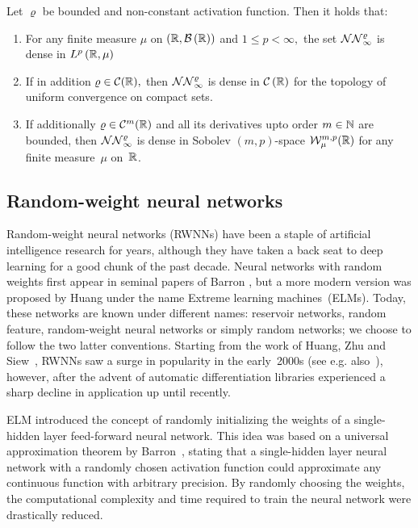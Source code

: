 \begin{theorem}\label{thm:UAT}
Let $\varrho$ be bounded and
non-constant activation function. Then it holds that:
\begin{enumerate}
\item For any finite measure $\mu$ on $\left(\mathbb{R}, \mathcal{B}\left(\mathbb{R}\right)\right)$ and $1 \leq p<\infty,$ the set
$\mathcal{NN}_{\infty}^{\varrho}$ is dense in $L^{p}\left(\mathbb{R}, \mu\right)$
\item If in addition $\varrho \in \mathcal{C}(\mathbb{R}),$ then $\mathcal{NN}_{\infty}^{\varrho}$ is dense in $\mathcal{C}\left(\mathbb{R}\right)$ for the
topology of uniform convergence on compact sets.
\item If additionally $\varrho\in \mathcal{C}^m(\mathbb{R})$ and all its derivatives upto order $m\in\mathbb{N}$ are bounded, then $\mathcal{NN}_{\infty}^{\varrho}$ is dense in Sobolev $(m,p)$-space $\mathcal{W}^{m,p}_{\mu}(\mathbb{R})$ for any finite measure~$\mu$ on~$\mathbb{R}$.
\end{enumerate}
\end{theorem}

\subsection{Random-weight neural networks}\label{sec:RWNN}

Random-weight neural networks (RWNNs) have been a staple of artificial intelligence research for years, although they have taken a back seat to deep learning for a good chunk of the past decade. Neural networks with random weights first appear in seminal papers of Barron \cite{Barron1992NeuralSystems, Barron1993UniversalFunction}, but a more modern version was proposed by Huang \cite{Huang2006UniversalNodes} under the name Extreme learning machines~(ELMs). Today, these networks are known under different names: reservoir networks, random feature, random-weight neural networks or simply random networks; we choose to follow the two latter conventions. Starting from the work of Huang, Zhu and Siew~\cite{Huang2006UniversalNodes}, RWNNs saw a surge in popularity in the early~2000s (see e.g. also~\cite{Rahimi2007RandomMachines, Rahimi2008WeightedLearning}), however, after the advent of automatic differentiation libraries experienced a sharp decline in application up until recently.

ELM introduced the concept of randomly initializing the weights of a single-hidden layer feed-forward neural network. This idea was based on a universal approximation theorem by Barron~\cite{Barron1993UniversalFunction}, stating that a single-hidden layer neural network with a randomly chosen activation function could approximate any continuous function with arbitrary precision. By randomly choosing the weights, the computational complexity and time required to train the neural network were drastically reduced.

